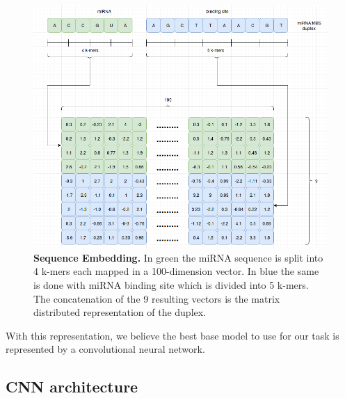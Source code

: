 \begin{figure}[hbt!]
	\centering
	\includegraphics[width=\textwidth, height=0.4\textheight]{Figures/dna_embedding}
	\caption{\textbf{Sequence Embedding.} In green the miRNA sequence is split into 4 k-mers each mapped in a 100-dimension vector. In blue the same is done with miRNA binding site which is divided into 5 k-mers. The concatenation of the 9 resulting vectors is the matrix distributed representation of the duplex.}
	\label{fig:dna_embedding}
\end{figure}

With this representation, we believe the best base model to use for our task is represented by a convolutional neural network. 

\subsection{CNN architecture}


  

